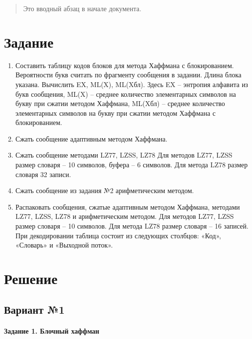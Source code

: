 \documentclass[a4paper, 12pt]{article}
\begin{document}
 
\tableofcontents

\pagebreak

\begin{abstract}
  Это вводный абзац в начале документа.
\end{abstract}
 
\section{Задание}
\begin{enumerate}
\item Составить таблицу кодов блоков для метода Хаффмана с блокированием. Вероятности букв считать по фрагменту сообщения в задании. Длина блока указана. Вычислить EX, ML(X), ML(Xбл). Здесь EX – энтропия алфавита из букв сообщения, ML(X) – среднее количество элементарных символов на букву при сжатии методом Хаффмана, ML(Xбл) – среднее количество элементарных символов на букву при сжатии методом Хаффмана с блокированием. 
\item Сжать сообщение адаптивным методом Хаффмана. 
\item Сжать сообщение методами LZ77, LZSS, LZ78  Для методов LZ77, LZSS размер словаря – 10 символов, буфера – 6 символов. Для метода LZ78 размер словаря 32 записи. 
\item Сжать сообщение из задания №2 арифметическим методом. 
\item Распаковать сообщения, сжатые адаптивным методом Хаффмана, методами LZ77, LZSS, LZ78 и арифметическим методом. Для методов LZ77, LZSS размер словаря – 10 символов. Для метода LZ78 размер словаря – 16 записей. При декодировании таблица состоит из следующих столбцов: «Код», «Словарь» и «Выходной поток».
\end{enumerate}
\pagebreak
\section{Решение}
\subsection{Вариант №1}
\paragraph{Задание 1. Блочный хаффман \\}
\end{document}
